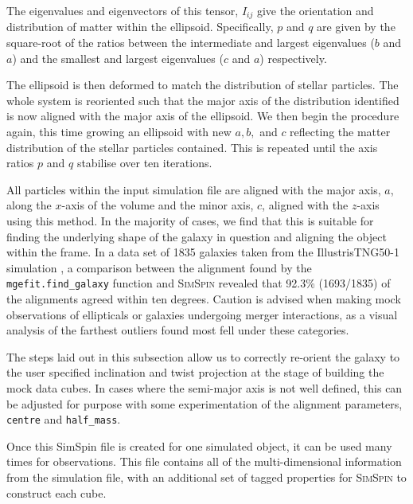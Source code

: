 \documentclass[
  journal=pasa,
  manuscript=research-paper, %
  year=2020,
  volume=37,
]{cup-journal}
\newcommand{\simspin}[1]{\textsc{SimSpin}#1} %
\begin{document}
The eigenvalues and eigenvectors of this tensor, $I_{ij}$ give the orientation and distribution of matter within the ellipsoid. 
Specifically, $p$ and $q$ are given by the square-root of the ratios between the intermediate and largest eigenvalues ($b$ and $a$) and the smallest and largest eigenvalues ($c$ and $a$) respectively. 

The ellipsoid is then deformed to match the distribution of stellar particles.
The whole system is reoriented such that the major axis of the distribution identified is now aligned with the major axis of the ellipsoid. 
We then begin the procedure again, this time growing an ellipsoid with new $a, b,$ and $c$ reflecting the matter distribution of the stellar particles contained. 
This is repeated until the axis ratios $p$ and $q$ stabilise over ten iterations. 

All particles within the input simulation file are aligned with the major axis, $a$, along the $x$-axis of the volume and the minor axis, $c$, aligned with the $z$-axis using this method. 
In the majority of cases, we find that this is suitable for finding the underlying shape of the galaxy in question and aligning the object within the frame. 
In a data set of 1835 galaxies taken from the IllustrisTNG50-1 simulation \citep{Nelson2019TNG50, Pillepich2019TNG50Gas}, a comparison between the alignment found by the \texttt{mgefit.find\_galaxy} function \citep{Cappellari2002Efficientgalaxies} and \simspin{} revealed that 92.3\% (1693/1835) of the alignments agreed within ten degrees. 
Caution is advised when making mock observations of ellipticals or galaxies undergoing merger interactions, as a visual analysis of the farthest outliers found most fell under these categories.

The steps laid out in this subsection allow us to correctly re-orient the galaxy to the user specified inclination and twist projection at the stage of building the mock data cubes. 
In cases where the semi-major axis is not well defined, this can be adjusted for purpose with some experimentation of the alignment parameters, \texttt{centre} and \texttt{half\_mass}.

\vspace{0.5cm}

\noindent Once this SimSpin file is created for one simulated object, it can be used many times for observations. 
This file contains all of the multi-dimensional information from the simulation file, with an additional set of tagged properties for \simspin{} to construct each cube. 
\end{document}

